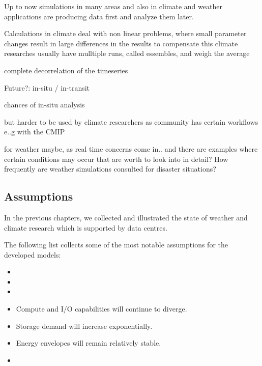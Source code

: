 {\begin{itemize}
\end{itemize}




Up to now simulations in many areas and also in climate and weather applications
are producing data first and analyze them later.




Calculations in climate deal with non linear problems, where small parameter changes result in large differences in the results
to compensate this climate researches usually have mulltiple runs, called essembles, and weigh the average

complete decorrelation of the timeseries

\cite{alexander_software_2015-1}






Future?:
in-situ / in-transit

chances of in-situ analysis




but harder to be used by climate researchers as community has certain workflows e..g with the CMIP


for weather maybe, as real time concerns come in.. and there are examples where certain conditions may occur that are worth to look into in detail?
How frequently are weather simulations consulted for disaster situations?






\subsection{Assumptions}
\label{sec:modeling/assumptions}

In the previous chapters, we collected and illustrated the state of weather and climate research which is supported by data centres.

The following list collects some of the most notable assumptions for the developed models:
\begin{itemize}
	\item
	\item
	\item
\end{itemize}



\begin{itemize}
	\item Compute and I/O capabilities will continue to diverge.
	\item Storage demand will increase exponentially.
	\item Energy envelopes will remain relatively stable.
	\item
\end{itemize}


}
